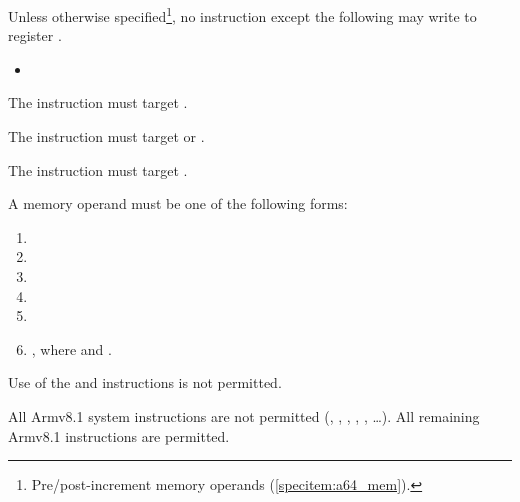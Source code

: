 \specitem
Unless otherwise specified\footnote{Pre/post-increment memory operands (\ref{specitem:a64_mem}).}, no instruction except the following may write to register \xsp.

\begin{itemize}
    \item {}
\end{itemize}


\specitem
The  instruction must target \xaddr.

\specitem
The  instruction must target \xaddr or \xret.

\specitem
The  instruction must target \xret.


\specitem
\label{specitem:a64_mem}
A memory operand must be one of the following forms:

\begin{enumerate}
    \item \code{[\xaddr, \#i]}
    \item \code{[\xsp, \#i]}
    \item \code{[\xsp, \#i]!}
    \item {}
    \item {}
    \item \code{[\xbase, \#i]}, where  and .
\end{enumerate}


\specitem
Use of the  and  instructions is not permitted.


\specitem
All Armv8.1 system instructions are not permitted (, , , , , \ldots). All remaining Armv8.1 instructions are permitted.

\let\xbase\undefined
\let\xaddr\undefined
\let\xret\undefined
\let\xsp\undefined
